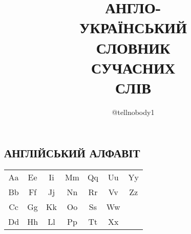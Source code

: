 


\title{\uppercase{Англо-\\український\\словник\\сучасних\\слів}}
\author{@tellnobody1}
\maketitle

\thispagestyle{empty}
\clearpage

\begin{center}
\section{\uppercase{Англійський алфавіт}}
\begin{tabular}{| c c c c c c c |}
  \hline
  Aa & Ee & Ii & Mm & Qq & Uu & Yy \\
  Bb & Ff & Jj & Nn & Rr & Vv & Zz \\
  Cc & Gg & Kk & Oo & Ss & Ww &    \\
  Dd & Hh & Ll & Pp & Tt & Xx &    \\
  \hline
\end{tabular}
\end{center}

\thispagestyle{empty}
\clearpage

